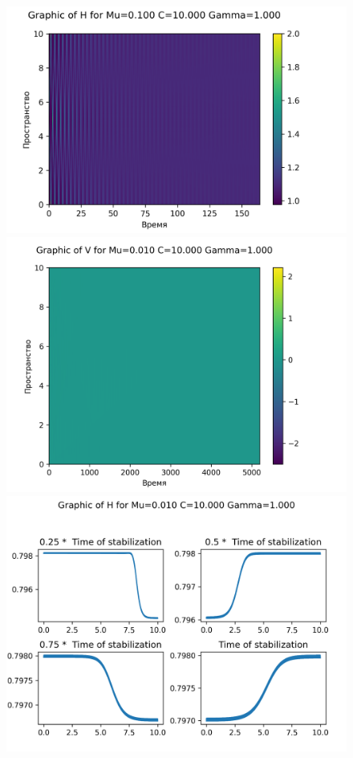 \begin{figure}[H]
	\centering
	\includegraphics[scale=0.5]{../graphs_data_nonsmooth_2/value/Graph_H_mu0.010_C10.000_gamma1.000.png}
	\includegraphics[scale=0.5]{../graphs_data_nonsmooth_2/value/Graph_V_mu0.010_C10.000_gamma1.000.png}	
	\includegraphics[scale=0.5]{../graphs_data_nonsmooth_2/slices/Graph_H_mu0.010_C10.000_gamma1.000.png}

\end{figure}
